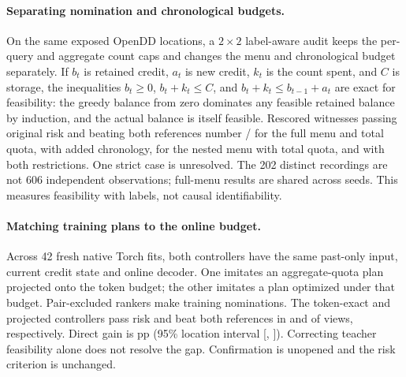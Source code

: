 \paragraph{Separating nomination and chronological budgets.}
On the same exposed OpenDD locations, a $2\times2$ label-aware audit
keeps the per-query and aggregate count caps and changes the menu and
chronological budget separately. If $b_t$ is retained credit, $a_t$ is
new credit, $k_t$ is the count spent, and $C$ is storage, the inequalities
$b_t\geq0$, $b_t+k_t\leq C$, and $b_t+k_t\leq b_{t-1}+a_t$ are exact for
feasibility: the greedy balance from zero dominates any feasible
retained balance by induction, and the actual balance is itself
feasible. Rescored witnesses passing original risk and beating both
references number \StreamingTeacherFullTotal{}/\StreamingTeacherViews{}
for the full menu and total quota, \StreamingTeacherFullToken{} with
added chronology, \StreamingTeacherNestedTotal{} for the nested menu
with total quota, and \StreamingTeacherNestedToken{} with both
restrictions. One strict case is unresolved. The 202 distinct recordings
are not 606 independent observations; full-menu results are shared across
seeds. This measures feasibility with labels, not causal identifiability.

\paragraph{Matching training plans to the online budget.}
Across 42 fresh native Torch fits, both controllers have the same
past-only input, current credit state and online decoder. One imitates
an aggregate-quota plan projected onto the token budget; the other
imitates a plan optimized under that budget. Pair-excluded rankers make
training nominations. The token-exact and projected controllers pass
risk and beat both references in \StreamingTeacherExact{} and
\StreamingTeacherProjected{} of \StreamingTeacherViews{} views,
respectively. Direct gain is \StreamingTeacherGap{} pp (95\% location
interval [\StreamingTeacherLow{}, \StreamingTeacherHigh{}]). Correcting
teacher feasibility alone does not resolve the gap. Confirmation is
unopened and the risk criterion is unchanged.
